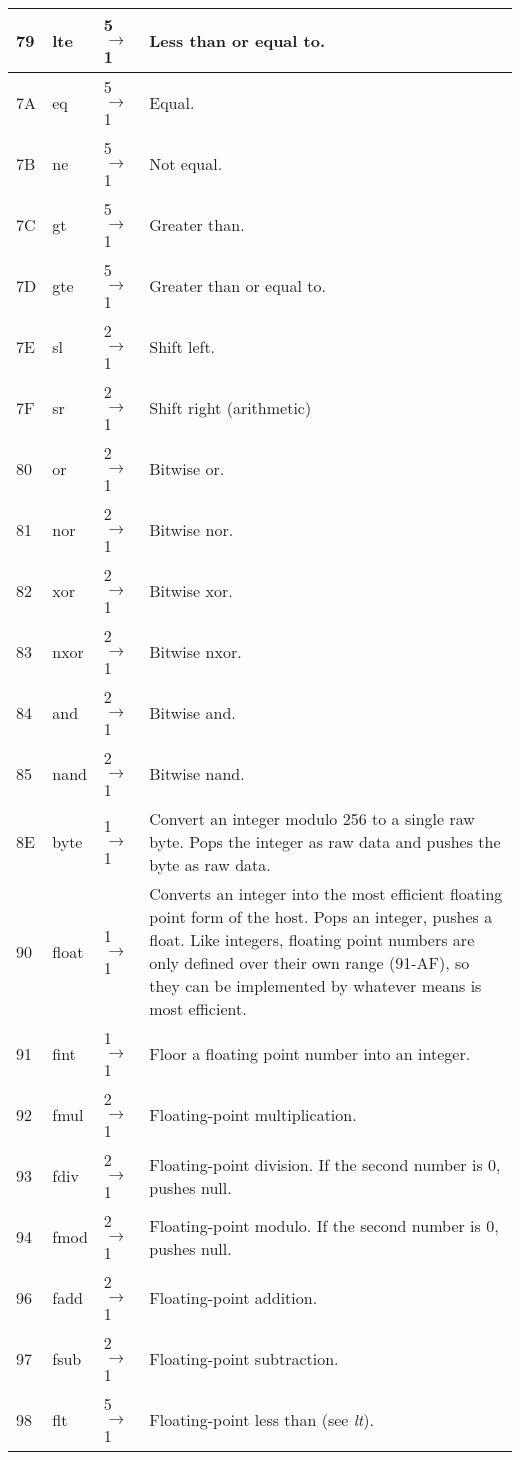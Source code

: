 \begin{longtable}{ | l | l | l | X | }
\hline
79 & lte & 5 $\rightarrow$ 1 & Less than or equal to. \\
\hline
7A & eq & 5 $\rightarrow$ 1 & Equal. \\
\hline
7B & ne & 5 $\rightarrow$ 1 & Not equal. \\
\hline
7C & gt & 5 $\rightarrow$ 1 & Greater than. \\
\hline
7D & gte & 5 $\rightarrow$ 1 & Greater than or equal to. \\
\hline
7E & sl & 2 $\rightarrow$ 1 & Shift left. \\
\hline
7F & sr & 2 $\rightarrow$ 1 & Shift right (arithmetic) \\
\hline
80 & or & 2 $\rightarrow$ 1 & Bitwise or. \\
\hline
81 & nor & 2 $\rightarrow$ 1 & Bitwise nor. \\
\hline
82 & xor & 2 $\rightarrow$ 1 & Bitwise xor. \\
\hline
83 & nxor & 2 $\rightarrow$ 1 & Bitwise nxor. \\
\hline
84 & and & 2 $\rightarrow$ 1 & Bitwise and. \\
\hline
85 & nand & 2 $\rightarrow$ 1 & Bitwise nand. \\
\hline
8E & byte & 1 $\rightarrow$ 1 & Convert an integer modulo 256 to a single raw byte. Pops the integer as raw data and pushes the byte as raw data. \\
\hline
90 & float & 1 $\rightarrow$ 1 & Converts an integer into the most efficient floating point form of the host. Pops an integer, pushes a float. Like integers, floating point numbers are only defined over their own range (91-AF), so they can be implemented by whatever means is most efficient. \\
\hline
91 & fint & 1 $\rightarrow$ 1 & Floor a floating point number into an integer. \\
\hline
92 & fmul & 2 $\rightarrow$ 1 & Floating-point multiplication. \\
\hline
93 & fdiv & 2 $\rightarrow$ 1 & Floating-point division. If the second number is 0, pushes null. \\
\hline
94 & fmod & 2 $\rightarrow$ 1 & Floating-point modulo. If the second number is 0, pushes null. \\
\hline
96 & fadd & 2 $\rightarrow$ 1 & Floating-point addition. \\
\hline
97 & fsub & 2 $\rightarrow$ 1 & Floating-point subtraction. \\
\hline
98 & flt & 5 $\rightarrow$ 1 & Floating-point less than (see \textit{lt}). \\

\end{longtable}
